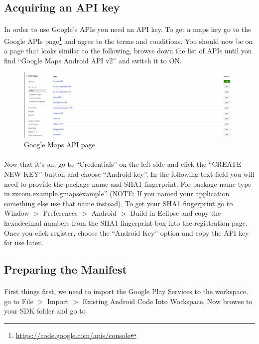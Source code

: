 \subsection{Acquiring an API key}
\paragraph{} In order to use Google’s APIs you need an API key.  To get a maps key go to the Google APIs page\footnote{\url{https://code.google.com/apis/console}} and agree to the terms and conditions. You should now be on a page that looks similar to the following, browse down the list of APIs until you find “Google Maps Android API v2” and switch it to ON.

\begin{figure}[H]%
\centering
\includegraphics[width=\textwidth]{images/google-maps-api-page}
\caption{Google Maps API page}
\label{fig:google-maps-api-page}
\end{figure}

\paragraph{} Now that it’s on, go to ``Credentials'' on the left side and click the ``CREATE NEW KEY'' button and choose ``Android key''.  In the following text field you will need to provide the package name and SHA1 fingerprint. For package name type in zzcom.example.gmapsexample'' (NOTE: If you named your application something else use that name instead). To get your SHA1 fingerprint go to Window $>$ Preferences $>$ Android $>$ Build in Eclipse and copy the hexadecimal numbers from the SHA1 fingerprint box into the registration page. Once you click register, choose the “Android Key” option and copy the API key for use later.

\subsection{Preparing the Manifest}
\paragraph{} First things first, we need to import the Google Play Services to the workspace, go to File $>$ Import $>$ Existing Android Code Into Workspace.  Now browse to your SDK folder and go to 

